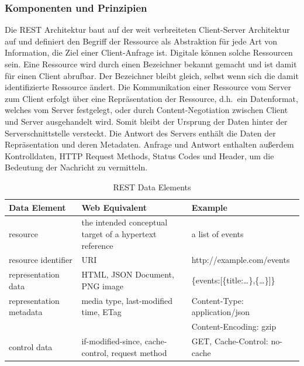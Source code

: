 \subsubsection{Komponenten und Prinzipien}
Die REST Architektur baut auf der weit verbreiteten Client-Server Architektur auf und definiert den Begriff der Ressource als Abstraktion für jede Art von Information, die Ziel einer Client-Anfrage ist.\cite[vgl.][88f.]{REST}
Digitale  können solche Ressourcen sein.
Eine Ressource wird durch einen Bezeichner bekannt gemacht und ist damit für einen Client abrufbar.
Der Bezeichner bleibt gleich, selbst wenn sich die damit identifizierte Ressource ändert.
Die Kommunikation einer Ressource vom Server zum Client erfolgt über eine Repräsentation der Ressource, d.h.\ ein Datenformat, welches vom Server festgelegt, oder durch Content-Negotiation zwischen Client und Server ausgehandelt wird.
Somit bleibt der Ursprung der Daten hinter der Serverschnittstelle versteckt.
Die Antwort des Servers enthält die Daten der Repräsentation und deren Metadaten.
Anfrage und Antwort enthalten außerdem Kontrolldaten, \zB{} HTTP Request Methods, Status Codes und Header, um die Bedeutung der Nachricht zu vermitteln.\cite[vgl.][90f.]{REST}
\begin{table}[h!]
  \begin{center}
    \caption{REST Data Elements}
    \label{tab:REST Data Elemens}
    \begin{tabularx}{\textwidth}{XXX}
      \toprule
      \textbf{Data Element} & \textbf{Web Equivalent} & \textbf{Example}\\
      \midrule
      resource & the intended conceptual target of a hypertext reference & a list of events\\
      resource identifier & URI & http://example.com/events\\
      representation data & HTML, JSON Document, PNG image & \{events:[\{title:\dots\},\{\dots\}]\}\\
      representation metadata & media type, last-modified time, ETag & Content-Type: application/json\\
      & & Content-Encoding: gzip\\
      control data & if-modified-since, cache-control, request method & GET, Cache-Control: no-cache\\
    \end{tabularx}
  \end{center}
\end{table}
